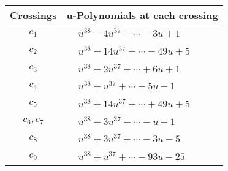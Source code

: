 \documentclass[1p]{elsarticle_modified}
\theoremstyle{definition}
\begin{document}
\begin{tabular}{m{50pt}|m{274pt}}
Crossings & \hspace{64pt}u-Polynomials at each crossing \\
\hline $$\begin{aligned}c_{1}\end{aligned}$$&$\begin{aligned}
&u^{38}-4 u^{37}+\cdots-3 u+1
\end{aligned}$\\
\hline $$\begin{aligned}c_{2}\end{aligned}$$&$\begin{aligned}
&u^{38}-14 u^{37}+\cdots-49 u+5
\end{aligned}$\\
\hline $$\begin{aligned}c_{3}\end{aligned}$$&$\begin{aligned}
&u^{38}-2 u^{37}+\cdots+6 u+1
\end{aligned}$\\
\hline $$\begin{aligned}c_{4}\end{aligned}$$&$\begin{aligned}
&u^{38}+u^{37}+\cdots+5 u-1
\end{aligned}$\\
\hline $$\begin{aligned}c_{5}\end{aligned}$$&$\begin{aligned}
&u^{38}+14 u^{37}+\cdots+49 u+5
\end{aligned}$\\
\hline $$\begin{aligned}c_{6},c_{7}\end{aligned}$$&$\begin{aligned}
&u^{38}+3 u^{37}+\cdots- u-1
\end{aligned}$\\
\hline $$\begin{aligned}c_{8}\end{aligned}$$&$\begin{aligned}
&u^{38}+3 u^{37}+\cdots-3 u-5
\end{aligned}$\\
\hline $$\begin{aligned}c_{9}\end{aligned}$$&$\begin{aligned}
&u^{38}+u^{37}+\cdots-93 u-25
\end{aligned}$\\

\end{tabular}
\end{document}
